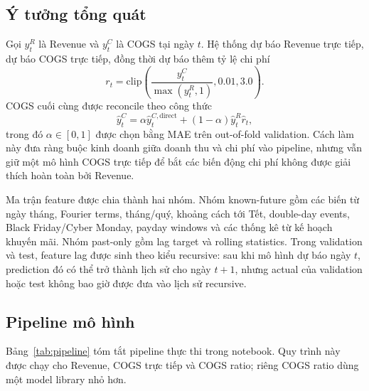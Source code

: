 \documentclass{article}
\begin{document}
\subsection{Ý tưởng tổng quát}

Gọi $y^{R}_{t}$ là Revenue và $y^{C}_{t}$ là COGS tại ngày $t$. Hệ thống dự báo
Revenue trực tiếp, dự báo COGS trực tiếp, đồng thời dự báo thêm tỷ lệ chi phí
\begin{equation}
  r_t = \mathrm{clip}\left(\frac{y^{C}_{t}}{\max(y^{R}_{t}, 1)}, 0.01, 3.0\right).
\end{equation}
COGS cuối cùng được reconcile theo công thức
\begin{equation}
  \hat{y}^{C}_t =
  \alpha \hat{y}^{C,\mathrm{direct}}_t +
  (1-\alpha)\hat{y}^{R}_t \hat{r}_t,
\end{equation}
trong đó $\alpha \in [0,1]$ được chọn bằng MAE trên out-of-fold validation. Cách
làm này đưa ràng buộc kinh doanh giữa doanh thu và chi phí vào pipeline, nhưng
vẫn giữ một mô hình COGS trực tiếp để bắt các biến động chi phí không được giải
thích hoàn toàn bởi Revenue.

Ma trận feature được chia thành hai nhóm. Nhóm known-future gồm các biến từ
ngày tháng, Fourier terms, tháng/quý, khoảng cách tới Tết, double-day events,
Black Friday/Cyber Monday, payday windows và các thống kê từ kế hoạch khuyến
mãi. Nhóm past-only gồm lag target và rolling statistics. Trong validation và
test, feature lag được sinh theo kiểu recursive: sau khi mô hình dự báo ngày
$t$, prediction đó có thể trở thành lịch sử cho ngày $t+1$, nhưng actual của
validation hoặc test không bao giờ được đưa vào lịch sử recursive.

\subsection{Pipeline mô hình}

Bảng~\ref{tab:pipeline} tóm tắt pipeline thực thi trong notebook. Quy trình này
được chạy cho Revenue, COGS trực tiếp và COGS ratio; riêng COGS ratio dùng một
model library nhỏ hơn.
\end{document}
